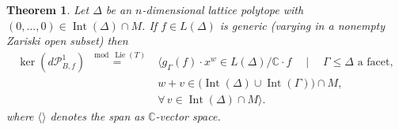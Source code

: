 \documentclass[12pt, english]{article}
\newtheorem{theorem}[definition]{Theorem}
\DeclareMathOperator{\Lie}{Lie}
\DeclareMathOperator{\Int}{Int}
\begin{document}
\begin{theorem} \label{Theorem_formula_ker_ITT_intro}
	Let $\Delta$ be an $n$-dimensional lattice polytope with $(0,...,0) \in \Int(\Delta) \cap M$. If $f \in L(\Delta)$ is generic (varying in a nonempty Zariski open subset) then
	\begin{align} \label{general_formula_for_ker_DP_MDelta_handable_intro}
		\ker(d \mathcal{P}_{B,f}^1) \overset{\mod \Lie(T)}{=}&  \Big\langle g_{\Gamma}(f) \cdot x^w \in L(\Delta)/\mathbb{C} \cdot f \quad \mid \quad  \Gamma \leq \Delta \textrm{ a facet}, \nonumber  \\
		& w + v \in \big( \Int(\Delta) \cup \Int(\Gamma) \big) \cap M, \nonumber \quad \\ 
		& \forall \, v \in \Int(\Delta) \cap M \Big\rangle. \nonumber
	\end{align}
	where $\langle \rangle$ denotes the span as $\mathbb{C}$-vector space.
\end{theorem}
\end{document}
